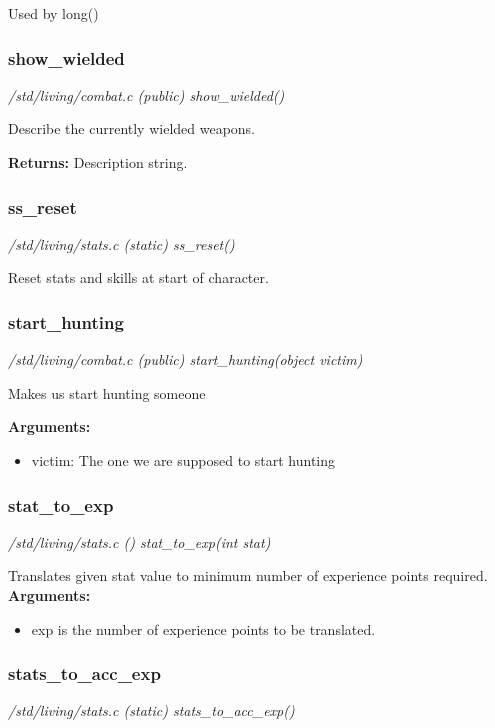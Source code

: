 Used by long()


\subsubsection{show\_wielded}

{\em /std/living/combat.c (public) show\_wielded()}

Describe the currently wielded weapons.

{\bf Returns:}        Description string.


\subsubsection{ss\_reset}

{\em /std/living/stats.c (static) ss\_reset()}

Reset stats and skills at start of character.


\subsubsection{start\_hunting}

{\em /std/living/combat.c (public) start\_hunting(object victim)}

Makes us start hunting someone

{\bf Arguments:}
\begin{itemize}
\item     victim: The one we are supposed to start hunting
\end{itemize}


\subsubsection{stat\_to\_exp}

{\em /std/living/stats.c () stat\_to\_exp(int stat)}

Translates given stat value to minimum number of experience points required.
{\bf Arguments:}
\begin{itemize}
\item exp is the number of experience points to be translated.
\end{itemize}


\subsubsection{stats\_to\_acc\_exp}

{\em /std/living/stats.c (static) stats\_to\_acc\_exp()}

